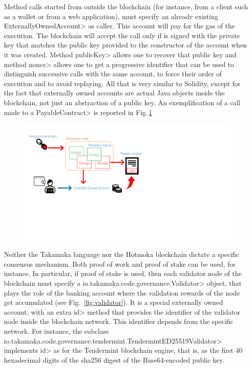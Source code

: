 Method calls started from outside the blockchain (for instance, from a client such as a wallet
or from a web application), must specify an already existing \<ExternallyOwnedAccount>
as caller. This account will pay for the gas of the execution. The blockchain will accept
the call only if is signed with the private key that matches the public key provided to
the constructor of the account when it was created. Method \<publicKey> allows one to
recover that public key and method \<nonce> allows one to get a progressive identifier that
can be used to distinguish successive calls with the same account, to force their order
of execution and to avoid replaying.
All that is very similar to Solidity, except for the fact that externally owned accounts
are actual Java objects inside the blockchain, not just an abstraction of a public key. An exemplification of a call made to a \<PayableContract> is reported in Fig.\,\ref{figure.takamaka_payable_contract}

\begin{figure}[ht]
\centering
\includegraphics[width=.9\linewidth]{figures/takamaka_payable_contract}
\caption{}
\label{figure.takamaka_payable_contract}
\end{figure}

Neither the Takamaka language nor the Hotmoka blockchain dictate a specific consensus mechanism.
Both proof of work and proof of stake can be used, for instance. In particular, if proof of stake
is used, then each validator node of the blockchain must specify a
\<io.takamaka.code.governance.Validator> object, that plays the role of the
banking account where the validation rewards of the node get accumulated (see Fig.~\ref{fig:validator}).
It is a special externally owned account, with an extra \<id> method that provides the
identifier of the validator node inside the blockchain network. This identifier depends from the
specific network.
For instance, the subclass
\<io.takamaka.code.governance.tendermint.TendermintED25519Validator>
implements \<id> as for the Tendermint blockchain engine, that is,
as the first $40$ hexadecimal digits of the sha256 digest of the Base64-encoded public key.
